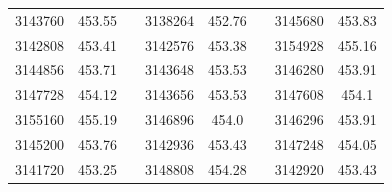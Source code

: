 \documentclass[12pt]{mwart}
\begin{document}
\begin{table}[H]
\begin{tabular}{cclcclcc}
		3143760                                                  & 453.55                                                        &  & 3138264                                                  & 452.76                                                        &  & 3145680                                                  & 453.83                                                        \\
		3142808                                                  & 453.41                                                        &  & 3142576                                                  & 453.38                                                        &  & 3154928                                                  & 455.16                                                        \\
		3144856                                                  & 453.71                                                        &  & 3143648                                                  & 453.53                                                        &  & 3146280                                                  & 453.91                                                        \\
		3147728                                                  & 454.12                                                        &  & 3143656                                                  & 453.53                                                        &  & 3147608                                                  & 454.1                                                         \\
		3155160                                                  & 455.19                                                        &  & 3146896                                                  & 454.0                                                         &  & 3146296                                                  & 453.91                                                        \\
		3145200                                                  & 453.76                                                        &  & 3142936                                                  & 453.43                                                        &  & 3147248                                                  & 454.05                                                        \\
		3141720                                                  & 453.25                                                        &  & 3148808                                                  & 454.28                                                        &  & 3142920                                                  & 453.43                                                        \\

\end{tabular}
\end{table}
\end{document}
